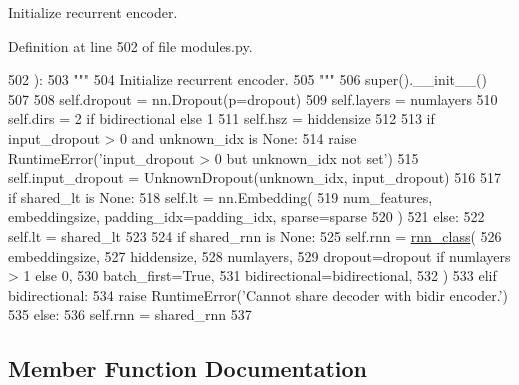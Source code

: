 \begin{DoxyVerb}Initialize recurrent encoder.
\end{DoxyVerb}
 

Definition at line 502 of file modules.\+py.


\begin{DoxyCode}
502     ):
503         \textcolor{stringliteral}{"""}
504 \textcolor{stringliteral}{        Initialize recurrent encoder.}
505 \textcolor{stringliteral}{        """}
506         super().\_\_init\_\_()
507 
508         self.dropout = nn.Dropout(p=dropout)
509         self.layers = numlayers
510         self.dirs = 2 \textcolor{keywordflow}{if} bidirectional \textcolor{keywordflow}{else} 1
511         self.hsz = hiddensize
512 
513         \textcolor{keywordflow}{if} input\_dropout > 0 \textcolor{keywordflow}{and} unknown\_idx \textcolor{keywordflow}{is} \textcolor{keywordtype}{None}:
514             \textcolor{keywordflow}{raise} RuntimeError(\textcolor{stringliteral}{'input\_dropout > 0 but unknown\_idx not set'})
515         self.input\_dropout = UnknownDropout(unknown\_idx, input\_dropout)
516 
517         \textcolor{keywordflow}{if} shared\_lt \textcolor{keywordflow}{is} \textcolor{keywordtype}{None}:
518             self.lt = nn.Embedding(
519                 num\_features, embeddingsize, padding\_idx=padding\_idx, sparse=sparse
520             )
521         \textcolor{keywordflow}{else}:
522             self.lt = shared\_lt
523 
524         \textcolor{keywordflow}{if} shared\_rnn \textcolor{keywordflow}{is} \textcolor{keywordtype}{None}:
525             self.rnn = \hyperlink{namespaceseq2seq_1_1train_a46177da1cc74c4a2874e4a527d857f75}{rnn\_class}(
526                 embeddingsize,
527                 hiddensize,
528                 numlayers,
529                 dropout=dropout \textcolor{keywordflow}{if} numlayers > 1 \textcolor{keywordflow}{else} 0,
530                 batch\_first=\textcolor{keyword}{True},
531                 bidirectional=bidirectional,
532             )
533         \textcolor{keywordflow}{elif} bidirectional:
534             \textcolor{keywordflow}{raise} RuntimeError(\textcolor{stringliteral}{'Cannot share decoder with bidir encoder.'})
535         \textcolor{keywordflow}{else}:
536             self.rnn = shared\_rnn
537 
\end{DoxyCode}


\subsection{Member Function Documentation}
\mbox{\label{classprojects_1_1controllable__dialogue_1_1controllable__seq2seq_1_1modules_1_1RNNEncoder_aff331ac57c336c48e5853f16edacb6db}} 
